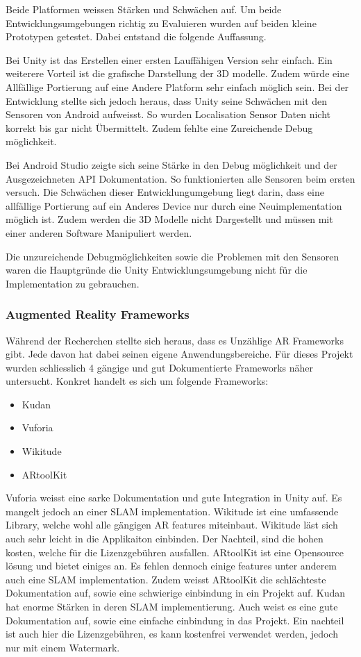 \documentclass[a4paper]{scrreprt}
\begin{document}
Beide Platformen weissen Stärken und Schwächen auf. Um beide Entwicklungsumgebungen richtig zu Evaluieren wurden auf beiden kleine Prototypen getestet. Dabei entstand die folgende Auffassung.

Bei Unity ist das Erstellen einer ersten Lauffähigen Version sehr einfach. Ein weiterere Vorteil ist die grafische Darstellung der 3D modelle. Zudem würde eine Allfällige Portierung auf eine Andere Platform sehr einfach möglich sein. Bei der Entwicklung stellte sich jedoch heraus, dass Unity seine Schwächen mit den Sensoren von Android aufweisst. So wurden Localisation Sensor Daten nicht korrekt bis gar nicht Übermittelt. Zudem fehlte eine Zureichende Debug möglichkeit.

Bei Android Studio zeigte sich seine Stärke in den Debug möglichkeit und der Ausgezeichneten API Dokumentation. So funktionierten alle Sensoren beim ersten versuch. Die Schwächen dieser Entwicklungumgebung liegt darin, dass eine allfällige Portierung auf ein Anderes Device nur durch eine Neuimplementation möglich ist. Zudem werden die 3D Modelle nicht Dargestellt und müssen mit einer anderen Software Manipuliert werden.

Die unzureichende Debugmöglichkeiten sowie die Problemen mit den Sensoren waren die Hauptgründe die Unity Entwicklungsumgebung nicht für die Implementation zu gebrauchen.

\subsubsection{Augmented Reality Frameworks}
Während der Recherchen stellte sich heraus, dass es Unzählige AR Frameworks gibt. Jede davon hat dabei seinen eigene Anwendungsbereiche. Für dieses Projekt wurden schliesslich 4 gängige und gut Dokumentierte Frameworks näher untersucht. Konkret handelt es sich um folgende Frameworks:
\begin{itemize}
\item Kudan
\item Vuforia
\item Wikitude
\item ARtoolKit
\end{itemize}

Vuforia weisst eine sarke Dokumentation und gute Integration in Unity auf. Es mangelt jedoch an einer SLAM implementation.
Wikitude ist eine umfassende Library, welche wohl alle gängigen AR features miteinbaut. Wikitude läst sich auch sehr leicht in die Applikaiton einbinden. Der Nachteil, sind die hohen kosten, welche für die Lizenzgebühren ausfallen.
ARtoolKit ist eine Opensource lösung und bietet einiges an. Es fehlen dennoch einige features unter anderem auch eine SLAM implementation. Zudem weisst ARtoolKit die schlächteste Dokumentation auf, sowie eine schwierige einbindung in ein Projekt auf.
Kudan hat enorme Stärken in deren SLAM implementierung. Auch weist es eine gute Dokumentation auf, sowie eine einfache einbindung in das Projekt. Ein nachteil ist auch hier die Lizenzgebühren, es kann kostenfrei verwendet werden, jedoch nur mit einem Watermark.
\end{document}
